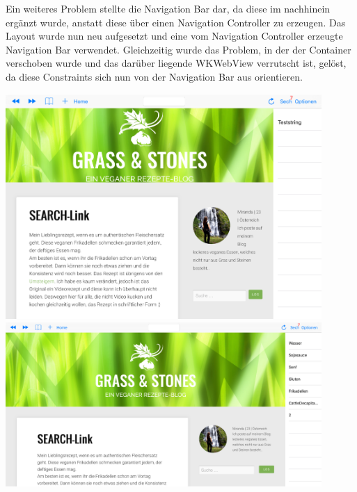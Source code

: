 Ein weiteres Problem stellte die Navigation Bar dar, da diese im nachhinein ergänzt wurde, anstatt diese über einen Navigation Controller zu erzeugen. Das Layout wurde nun neu aufgesetzt und eine vom Navigation Controller erzeugte Navigation Bar verwendet. Gleichzeitig wurde das Problem, in der der Container verschoben wurde und das darüber liegende WKWebView verrutscht ist, gelöst, da diese Constraints sich nun von der Navigation Bar aus orientieren.

\includegraphics[width=12cm]{Pics/WKWebView_Hochformat}
\newpage
\includegraphics[width=12cm]{Pics/WKWebView_Querformat}